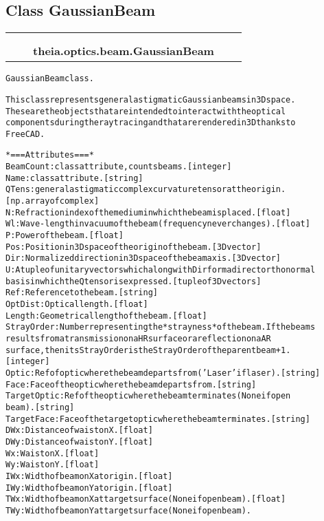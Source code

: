 
\subsection{Class GaussianBeam}

    \label{theia:optics:beam:GaussianBeam}
\begin{tabular}{cccccc}
\multicolumn{2}{r}{\settowidth{\BCL}{object}\multirow{2}{\BCL}{object}}
&&
  \\\cline{3-3}
  &&\multicolumn{1}{c|}{}
&&
  \\
&&\multicolumn{2}{l}{\textbf{theia.optics.beam.GaussianBeam}}
\end{tabular}

\begin{alltt}


GaussianBeam class.

This class represents general astigmatic Gaussian beams in 3D space.
These are the objects that are intended to interact with the optical
components during the ray tracing and that are rendered in 3D thanks to
FreeCAD.

*=== Attributes ===*
BeamCount: class attribute, counts beams. [integer]
Name: class attribute. [string]
QTens: general astigmatic complex curvature tensor at the origin.
    [np. array of complex]
N: Refraction index of the medium in which the beam is placed. [float]
Wl: Wave-length in vacuum of the beam (frequency never changes). [float]
P: Power of the beam. [float]
Pos: Position in 3D space of the origin of the beam. [3D vector]
Dir: Normalized direction in 3D space of the beam axis. [3D vector]
U: A tuple of unitary vectors which along with Dir form a direct orthonormal
    basis in which the Q tensor is expressed. [tuple of 3D vectors]
Ref: Reference to the beam. [string]
OptDist: Optical length. [float]
Length: Geometrical length of the beam. [float]
StrayOrder: Number representing the *strayness* of the beam. If the beams
    results from a transmission on a HR surface or a reflection on a AR
    surface, then its StrayOrder is the StrayOrder of the parent beam + 1.
    [integer]
Optic: Ref of optic where the beam departs from ('Laser' if laser). [string]
Face: Face of the optic where the beam departs from. [string]
TargetOptic: Ref of the optic where the beam terminates (None if open
    beam). [string]
TargetFace: Face of the target optic where the beam terminates. [string]
DWx: Distance of waist on X. [float]
DWy: Distance of waist on Y. [float]
Wx: Waist on X. [float]
Wy: Waist on Y. [float]
IWx: Width of beam on X at origin. [float]
IWy: Width of beam on Y at origin. [float]
TWx: Width of beam on X at target surface (None if open beam). [float]
TWy: Width of beam on Y at target surface (None if open beam).
\end{alltt}


